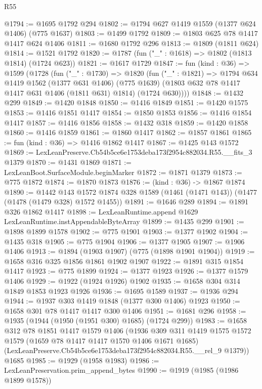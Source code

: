 \begin{lexlean}{R55}
\begin{coremodule}
{{@1794 := @1695 @1792 @294
@1802 := @1794 @627 @1419 @1559 (@1377 @624 @1406) (@775 @1637)
@1803 := @1499 @1792
@1809 := @1803 @625 @78 @1417 @1417 @624 @1406
@1811 := @1680 @1792 @296
@1813 := @1809 (@1811 @624)
@1814 := @1521 @1792
@1820 := @1787 (fun ("_" : @1618) => @1802 (@1813 @1814) (@1724 @623))
@1821 := @1617 @1729
@1847 := fun (kind : @36) =>
  @1599
    (@1728
      (fun ("_" : @1730) =>
      @1820
        (fun ("_" : @1821) =>
        @1794
          @634
          @1419
          @1562
          (@1377 @631 @1406)
          (@775 @1639)
          (@1803 @632 @78 @1417 @1417 @631 @1406 (@1811 @631) @1814)
          (@1724 @630))))
@1848 := @1432 @299
@1849 := @1420 @1848
@1850 := @1416 @1849
@1851 := @1420 @1575
@1853 := @1416 @1851 @1417
@1854 := @1850 @1853
@1856 := @1416 @1854 @1417
@1857 := @1416 @1856
@1858 := @1432 @318
@1859 := @1420 @1858
@1860 := @1416 @1859
@1861 := @1860 @1417
@1862 := @1857 @1861
@1865 := fun (kind : @36) => @1416 @1862 @1417
@1867 := @1425 @143 @1572
@1869 := LexLeanPreserve.Cb54b5ce6e1753deba173f2954c882034.R55.__fits_3 @1379
@1870 := @1431 @1869
@1871 := LexLeanBoot.SurfaceModule.beginMarker
@1872 := @1871 @1379
@1873 := @775 @1872
@1874 := @1870 @1873
@1876 := (kind : @36) -> @1867 @1874
@1890 := @1442
    @143
    @1572
    @1874
    @328
    @1589
    (@1461 (@1471 @143))
    (@1477 (@1478 (@1479 @328) @1572 @1455))
@1891 := @1646 @289
@1894 := @1891 @326 @1862 @1417
@1898 := LexLeanRuntime.append @1629 LexLeanRuntime.instAppendableByteArray
@1899 := @1435 @299
@1901 := @1898 @1899 @1578
@1902 := @775 @1901
@1903 := @1377 @1902
@1904 := @1435 @318
@1905 := @775 @1904
@1906 := @1377 @1905
@1907 := @1906 @1406
@1913 := @1894 (@1903 @1907) (@775 (@1898 @1901 @1904))
@1919 := @1658 @316 @325 @1856 @1861 @1902 @1907
@1922 := @1891 @315 @1854 @1417
@1923 := @775 @1899
@1924 := @1377 @1923
@1926 := @1377 @1579 @1406
@1929 := @1922 (@1924 @1926) @1902
@1935 := @1658 @304 @314 @1849 @1853 @1923 @1926
@1936 := @1695 @1589
@1937 := @1936 @294
@1944 := @1937 @303 @1419 @1848 (@1377 @300 @1406) @1923
@1950 := @1658 @301 @78 @1417 @1417 @300 @1406
@1951 := @1681 @296
@1958 := @1935 (@1944 (@1950 (@1951 @300) @1685) (@1724 @299))
@1983 := @1658
    @312
    @78
    @1851
    @1417
    @1579
    @1406
    (@1936
      @309
      @311
      @1419
      @1575
      @1572
      @1579
      (@1659 @78 @1417 @1417 @1570 @1406 @1671 @1685)
      (LexLeanPreserve.Cb54b5ce6e1753deba173f2954c882034.R55.__rel_9 @1379))
    @1685
@1985 := @1929 (@1958 @1983)
@1986 := LexLeanPreservation.prim_append_bytes
@1990 := @1919 (@1985 (@1986 @1899 @1578))
}}
\end{coremodule}
\end{lexlean}
